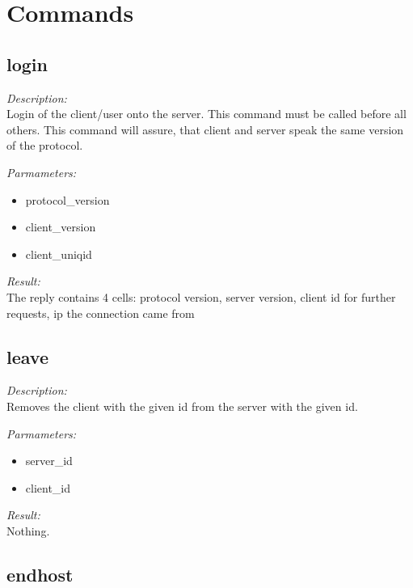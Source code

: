 \section{Commands}

\subsection{login}

\begin{description}
\item {\it Description:}\\
Login of the client/user onto the server. This command must be called before all others. This command will assure, that client and server speak the same version of the protocol.
\item {\it Parmameters:}
\begin{itemize}
\item protocol\_version
\item client\_version
\item client\_uniqid
\end{itemize}
\item {\it Result:}\\
The reply contains 4 cells: protocol version, server version, client id for further requests, ip the connection came from
\end{description}

\subsection{leave}

\begin{description}
\item {\it Description:}\\
Removes the client with the given id from the server with the given id.
\item {\it Parmameters:}
\begin{itemize}
\item server\_id
\item client\_id
\end{itemize}
\item {\it Result:}\\
Nothing.
\end{description}

\subsection{endhost}

